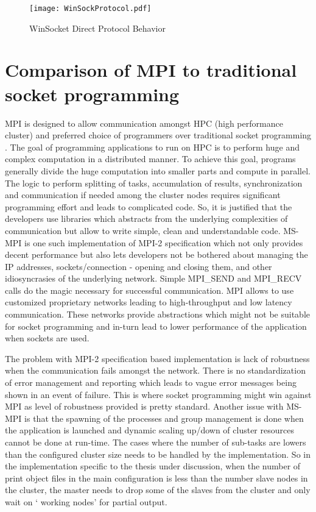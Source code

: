 \begin{figure}[ht!]
\centering
\texttt{[image: WinSockProtocol.pdf]}
\caption{WinSocket Direct Protocol Behavior}
\label{fig:WinsockProto}
\end{figure}
   
\section{Comparison of MPI to traditional socket programming}

MPI is designed to allow communication amongst HPC (high performance cluster) and preferred choice of programmers over traditional socket programming \cite{mpivssock}. The goal of programming applications to run on HPC is to perform huge and complex computation in a distributed manner. To achieve this goal, programs generally divide the huge computation into smaller parts and compute in parallel. The logic to perform splitting of tasks, accumulation of results, synchronization and communication if needed among the cluster nodes requires significant programming effort and leads to complicated code. So, it is justified that the developers use libraries which abstracts from the underlying complexities of communication but allow to write simple, clean and understandable code. MS-MPI is one such implementation of MPI-2 specification which not only provides decent performance but also lets developers not be bothered about managing the IP addresses, sockets/connection - opening and closing them, and other idiosyncrasies of the underlying network. Simple MPI\_SEND and MPI\_RECV calls do the magic necessary for successful communication. MPI allows to use customized proprietary networks leading to high-throughput and low latency communication. These networks provide abstractions which might not be suitable for socket programming and in-turn lead to lower performance of the application when sockets are used. \newline          

The problem with MPI-2 specification based implementation is lack of robustness when the communication fails amongst the network. There is no standardization of error management and reporting which leads to vague error messages being shown in an event of failure. This is where socket programming might win against MPI as level of robustness provided is pretty standard. Another issue with MS-MPI is that the spawning of the processes and group management is done when the application is launched and dynamic scaling up/down of cluster resources cannot be done at run-time. The cases where the number of sub-tasks are lowers than the configured cluster size needs to be handled by the implementation. So in the implementation specific to the thesis under discussion, when the number of print object files in the main configuration is less than the number slave nodes in the cluster, the master needs to drop some of the slaves from the cluster and only wait on {\lq} working nodes{\rq} for partial output. 
	
